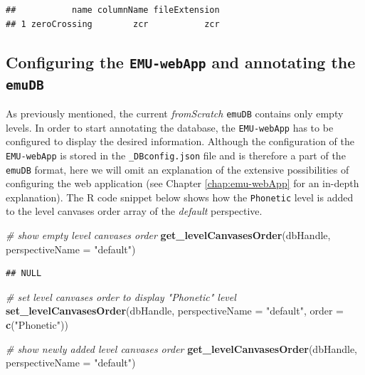 \documentclass[]{book}
\newenvironment{Shaded}{\begin{snugshade}}{\end{snugshade}}
\newcommand{\CommentTok}[1]{\textcolor[rgb]{0.56,0.35,0.01}{\textit{#1}}}
\newcommand{\DataTypeTok}[1]{\textcolor[rgb]{0.13,0.29,0.53}{#1}}
\newcommand{\KeywordTok}[1]{\textcolor[rgb]{0.13,0.29,0.53}{\textbf{#1}}}
\newcommand{\NormalTok}[1]{#1}
\newcommand{\StringTok}[1]{\textcolor[rgb]{0.31,0.60,0.02}{#1}}
\theoremstyle{definition}
\theoremstyle{definition}
\theoremstyle{definition}
\theoremstyle{remark}
\begin{document}
\begin{verbatim}
##           name columnName fileExtension
## 1 zeroCrossing        zcr           zcr
\end{verbatim}

\hypertarget{configuring-the-emu-webapp-and-annotating-the-emudb}{%
\subsection{\texorpdfstring{Configuring the \texttt{EMU-webApp} and
annotating the
\texttt{emuDB}}{Configuring the EMU-webApp and annotating the emuDB}}\label{configuring-the-emu-webapp-and-annotating-the-emudb}}

As previously mentioned, the current \emph{fromScratch} \texttt{emuDB}
contains only empty levels. In order to start annotating the database,
the \texttt{EMU-webApp} has to be configured to display the desired
information. Although the configuration of the \texttt{EMU-webApp} is
stored in the \texttt{\_DBconfig.json} file and is therefore a part of
the \texttt{emuDB} format, here we will omit an explanation of the
extensive possibilities of configuring the web application (see Chapter
\ref{chap:emu-webApp} for an in-depth explanation). The R code snippet
below shows how the \texttt{Phonetic} level is added to the level
canvases order array of the \emph{default} perspective.

\begin{Shaded}
\begin{Highlighting}[]
\CommentTok{# show empty level canvases order}
\KeywordTok{get_levelCanvasesOrder}\NormalTok{(dbHandle, }\DataTypeTok{perspectiveName =} \StringTok{"default"}\NormalTok{)}
\end{Highlighting}
\end{Shaded}

\begin{verbatim}
## NULL
\end{verbatim}

\begin{Shaded}
\begin{Highlighting}[]
\CommentTok{# set level canvases order to display "Phonetic" level}
\KeywordTok{set_levelCanvasesOrder}\NormalTok{(dbHandle,}
                       \DataTypeTok{perspectiveName =} \StringTok{"default"}\NormalTok{,}
                       \DataTypeTok{order =} \KeywordTok{c}\NormalTok{(}\StringTok{"Phonetic"}\NormalTok{))}

\CommentTok{# show newly added level canvases order}
\KeywordTok{get_levelCanvasesOrder}\NormalTok{(dbHandle, }\DataTypeTok{perspectiveName =} \StringTok{"default"}\NormalTok{)}
\end{Highlighting}
\end{Shaded}
\end{document}
